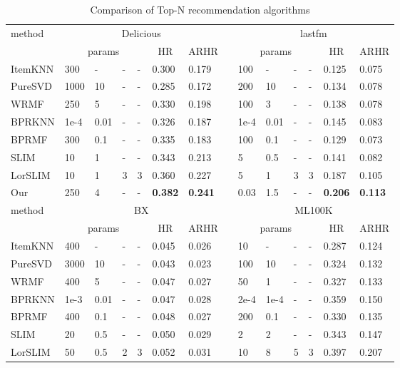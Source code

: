 \documentclass[letterpaper]{article}
\begin{document}
\begin{table}[ht]
\begin{center}
\begin{threeparttable}
\caption{Comparison of Top-N recommendation algorithms}
\label{tab:comp}
\tiny
\begin{tabular}{llllllllllllll}
\hline
\multirow{2}{*}{method} &
\multicolumn{6}{c}{Delicious} &
\multicolumn{1}{c}{}&
\multicolumn{6}{c}{lastfm} \\
\cline{2-7} \cline{9-14}
  & \multicolumn{4}{c}{params} &\multicolumn{1}{c}{HR}  & \multicolumn{1}{c}{ARHR} &\multicolumn{1}{c}{}&\multicolumn{4}{c}{params} &\multicolumn{1}{c}{HR}  & \multicolumn{1}{c}{ARHR} \\
\hline
ItemKNN&300&-&-&-&0.300&0.179&&100&-&-&-&0.125&0.075\\
PureSVD&1000&10&-&-&0.285&0.172&&200&10&-&-&0.134&0.078\\
WRMF&250&5&-&-&0.330&0.198&&100&3&-&-&0.138&0.078\\
BPRKNN&1e-4&0.01&-&-&0.326&0.187&&1e-4&0.01&-&-&0.145&0.083\\
BPRMF&300&0.1&-&-&0.335&0.183&&100&0.1&-&-&0.129&0.073\\
SLIM&10&1&-&-&0.343&0.213&&5&0.5&-&-&0.141&0.082\\
LorSLIM&10&1&3&3&0.360&0.227&&5&1&3&3&0.187&0.105\\
Our&250&4&-&-&\bf{0.382}&\bf{0.241}&&0.03&1.5&-&-&\bf{0.206}&\bf{0.113}\\
\hline\hline
\multirow{2}{*}{method} &
\multicolumn{6}{c}{BX} &
\multicolumn{1}{c}{}&
\multicolumn{6}{c}{ML100K} \\
\cline{2-7} \cline{9-14}
  & \multicolumn{4}{c}{params} &\multicolumn{1}{c}{HR}  & \multicolumn{1}{c}{ARHR} &\multicolumn{1}{c}{}&\multicolumn{4}{c}{params} &\multicolumn{1}{c}{HR}  & \multicolumn{1}{c}{ARHR} \\
\hline
ItemKNN&400&-&-&-&0.045&0.026&&10&-&-&-&0.287&0.124\\
PureSVD&3000&10&-&-&0.043&0.023&&100&10&-&-&0.324&0.132\\
WRMF&400&5&-&-&0.047&0.027&&50&1&-&-&0.327&0.133\\
BPRKNN&1e-3&0.01&-&-&0.047&0.028&&2e-4&1e-4&-&-&0.359&0.150\\
BPRMF&400&0.1&-&-&0.048&0.027&&200&0.1&-&-&0.330&0.135\\
SLIM&20&0.5&-&-&0.050&0.029&&2&2&-&-&0.343&0.147\\
LorSLIM&50&0.5&2&3&0.052&0.031&&10&8&5&3&0.397&0.207\\

\end{tabular}
\end{threeparttable}
\end{center}
\end{table}
\end{document}
